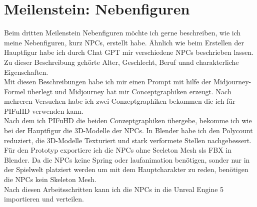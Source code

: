 \section {Meilenstein: Nebenfiguren}
Beim dritten Meilenstein Nebenfiguren möchte ich gerne beschreiben, wie ich meine Nebenfiguren, kurz NPCs, erstellt habe. Ähnlich wie beim Erstellen der Hauptfigur habe ich durch Chat GPT mir verschiedene NPCs beschrieben lassen. Zu dieser Beschreibung gehörte Alter, Geschlecht, Beruf unnd charakterliche Eigenschaften.
\\
Mit diesen Beschreibungen habe ich mir einen Prompt mit hilfe der Midjourney-Formel überlegt und Midjourney hat mir Conceptgraphiken erzeugt. Nach mehreren Versuchen habe ich zwei Conzeptgraphiken bekommen die ich für PIFuHD verwenden kann.
\\
Nach dem ich PIFuHD die beiden Conzeptgraphiken übergebe, bekomme ich wie bei der Hauptfigur die 3D-Modelle der NPCs. In Blender habe ich den Polycount reduziert, die 3D-Modelle Texturiert und stark verformete Stellen nachgebessert.
\\
Für den Prototyp exportiere ich die NPCs ohne Sceleton Mesh sls FBX in Blender. Da die NPCs keine Spring oder laufanimation benötigen, sonder nur in der Spielwelt platziert werden um mit dem Hauptcharakter zu reden, benötigen die NPCs kein Skeleton Mesh.
\\
Nach diesen Arbeitsschritten kann ich die NPCs in die Unreal Engine 5 importieren und verteilen.

